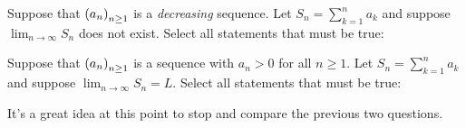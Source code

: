 \documentclass{ximera}
\begin{document}
\begin{question}
  Suppose that $\left( a_n \right)_{n \geq 1}$ is a \emph{decreasing} sequence.
  Let $S_n = \sum^n_{k=1} a_k$ and suppose $\lim_{n \to \infty} S_n$
  does not exist. Select all statements that must be true:
  \begin{selectAll}
  \end{selectAll}
\end{question}


\begin{question}
  Suppose that $\left( a_n \right)_{n \geq 1}$ is a sequence with $a_n > 0$ for all $n \geq 1$.
  Let $S_n = \sum^n_{k=1} a_k$ and suppose $\lim_{n \to \infty} S_n =
  L$. Select all statements that must be true:
  \begin{selectAll}
  \end{selectAll}
\end{question}

It's a great idea at this point to stop and compare the previous two questions.
\end{document}
